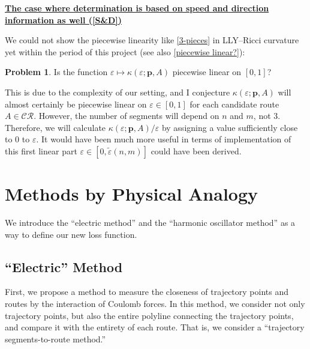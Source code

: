 \documentclass{article}
\numberwithin{equation}{section}
\theoremstyle{definition}
\newtheorem{prob}[prob]{Problem}
\newcommand{\CR}{\mathcal{CR}}
\newcommand{\K}{\kappa}
\newcommand{\eps}{\varepsilon} %
\newcommand{\kepa}{\kappa(\eps;\mathbf{p},A)}
\begin{document}
\underline{\textbf{The case where determination is based on speed and direction information as well (\autoref{S&D})}}

\vspace{1mm}
We could not show the piecewise linearity like \autoref{3-pieces} in LLY--Ricci curvature yet within the period of this project (see also \autoref{piecewise linear?}):

\begin{prob}
Is the function $\eps\mapsto\kepa$ piecewise linear on $[0,1]$?
\end{prob}

This is due to the complexity of our setting, and I conjecture $\K(\eps;\mathbf{p},A)$ will almost certainly be piecewise linear on $\eps\in[0,1]$ for each candidate route $A\in\CR$.
However, the number of segments will depend on $n$ and $m$, not 3.
Therefore, we will calculate $\kepa/\eps$ by assigning a value sufficiently close to 0 to $\eps$.
It would have been much more useful in terms of implementation of this first linear part $\eps\in[0,\tilde{\eps}(n,m)]$ could have been derived.


\section{Methods by Physical Analogy} \label{coulumb}

We introduce the ``electric method'' and the ``harmonic oscillator method'' as a way to define our new loss function.

\subsection{``Electric'' Method}

First, we propose a method to measure the closeness of trajectory points and routes by the interaction of Coulomb forces.
In this method, we consider not only trajectory points, but also the entire polyline connecting the trajectory points, and compare it with the entirety of each route. That is, we consider a “trajectory segments-to-route method.” 
\end{document}
